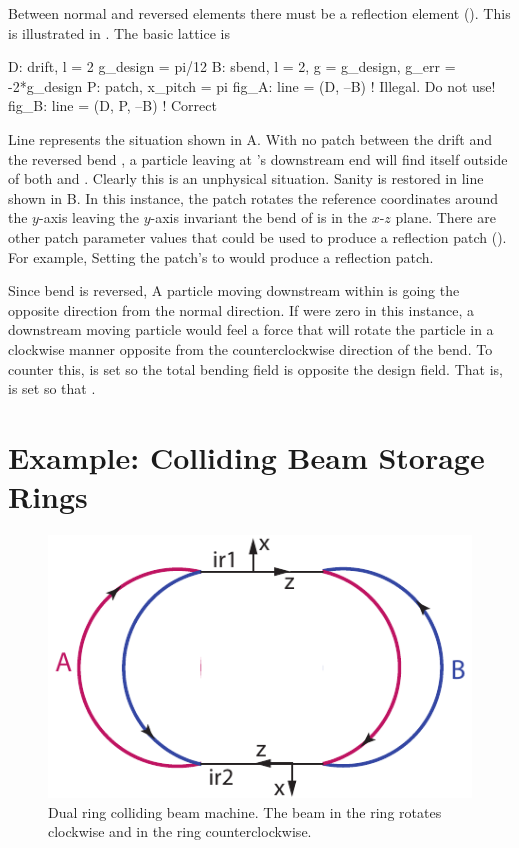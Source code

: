 Between normal and reversed elements there must be a reflection
 element ().  This is illustrated in
. The basic lattice is
\begin{example}
  D: drift, l = 2
  g_design = pi/12
  B: sbend, l = 2, g = g_design, g_err = -2*g_design
  P: patch, x_pitch = pi
  fig_A: line = (D, --B)     ! Illegal. Do not use!
  fig_B: line = (D, P, --B)  ! Correct
\end{example}
Line  represents the situation shown in
A.  With no patch between the drift  and
the reversed bend , a particle leaving  at 's
downstream end will find itself outside of both  and
. Clearly this is an unphysical situation. Sanity is restored in
line  shown in B. In this instance, the
patch  rotates the reference coordinates around the $y$-axis
leaving the $y$-axis invariant the bend of  is in the $x$-$z$
plane. There are other patch parameter values that could be used to
produce a reflection patch ().  For example,
Setting the patch's  to  would produce a reflection
patch.

Since bend  is reversed, A particle moving downstream within
 is going the opposite direction from the normal direction. If
 were zero in this instance, a downstream moving particle
would feel a force that will rotate the particle in a clockwise manner
opposite from the counterclockwise direction of the bend. To counter
this,  is set so the total bending field  is opposite the design field. That is,  is set so
that .

\section{Example: Colliding Beam Storage Rings}
\label{s:ex.collide}

\begin{figure}[tb]
  \centering
  \includegraphics[width=5in]{colliding-beams.pdf}
  \caption[Dual ring colliding beam machine]{Dual ring colliding beam machine. 
The beam in the  ring rotates clockwise and in the  ring
counterclockwise.}
  \label{f:collide}
\end{figure}

